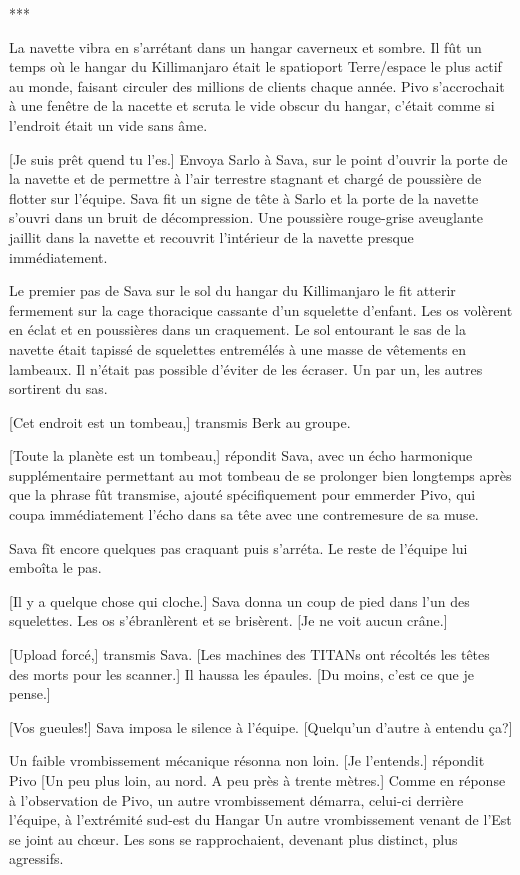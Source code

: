 \begin{center} *** \end{center} 

La navette vibra en s'arrétant dans un hangar caverneux et sombre. Il fût un temps où le hangar du Killimanjaro était le spatioport Terre/espace le plus actif au monde, faisant circuler des millions de clients chaque année. Pivo s'accrochait à une fenêtre de la nacette et scruta le vide obscur du hangar, c'était comme si l'endroit était un vide sans âme. 

[Je suis prêt quend tu l'es.] Envoya Sarlo à Sava, sur le point d'ouvrir la porte de la navette et de permettre à l'air terrestre stagnant et chargé de poussière de flotter sur l'équipe. Sava fit un signe de tête à Sarlo et la porte de la navette s'ouvri dans un bruit de décompression. Une poussière rouge-grise aveuglante jaillit dans la navette et recouvrit l'intérieur de la navette presque immédiatement. 

Le premier pas de Sava sur le sol du hangar du Killimanjaro le fit atterir fermement sur la cage thoracique cassante d'un squelette d'enfant. Les os volèrent en éclat et en poussières dans un craquement. Le sol entourant le sas de la navette était tapissé de squelettes entremélés à une masse de vêtements en lambeaux. Il n'était pas possible d'éviter de les écraser. Un par un, les autres sortirent du sas. 

[Cet endroit est un tombeau,] transmis Berk au groupe. 

[Toute la planète est un tombeau,] répondit Sava, avec un écho harmonique supplémentaire permettant au mot tombeau de se prolonger  bien longtemps après que la phrase fût transmise, ajouté spécifiquement pour emmerder Pivo, qui coupa immédiatement l'écho dans sa tête avec une contremesure de sa muse. 

Sava fît encore quelques pas craquant puis s'arréta. Le reste de l'équipe lui emboîta le pas. 

[Il y a quelque chose qui cloche.] Sava donna un coup de pied dans l'un des squelettes. Les os s'ébranlèrent et se brisèrent. [Je ne voit aucun crâne.] 

[Upload forcé,] transmis Sava. [Les machines des TITANs ont récoltés les têtes des morts pour les scanner.] Il haussa les épaules. [Du moins, c'est ce que je pense.] 

[Vos gueules!] Sava imposa le silence à l'équipe. [Quelqu'un d'autre à entendu ça?] 

Un faible vrombissement mécanique résonna non loin. [Je l'entends.] répondit Pivo [Un peu plus loin, au nord. A peu près à trente mètres.] Comme en réponse à l'observation de Pivo, un autre vrombissement démarra, celui-ci derrière l'équipe, à l'extrémité sud-est du Hangar Un autre vrombissement venant de l'Est se joint au chœur. Les sons se rapprochaient, devenant plus distinct, plus agressifs. 

